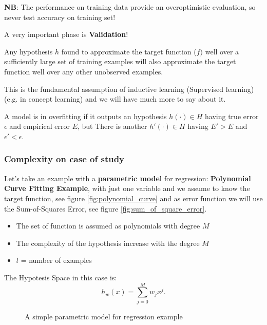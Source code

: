 \documentclass[../main.tex]{subfiles}
\begin{document}
\textbf{NB}: The performance on training data provide an overoptimistic evaluation, so never test accuracy on training set!

\begin{center}
A very important phase is \textbf{Validation}!   
\end{center}

\begin{definition}
Any hypothesis $h$ found to approximate the target function ($f)$ well over a sufficiently large
set of training examples will also approximate the target function well over any other unobserved examples.
\end{definition}

This is the fundamental assumption of inductive learning (Supervised learning) (e.g. in concept learning) and we will have much more to say about it.

\begin{definition}[Overfitting]
A model is in overfitting if it outputs an hypothesis $h(\cdot) \in H$ having true error $\epsilon$ and empirical error $E$, but There is another  $h'(\cdot) \in H$ having $E' > E$ and $\epsilon' < \epsilon$.
\end{definition}

\subsubsection{Complexity on case of study}
Let's take an example with a \textbf{parametric model} for regression: \textbf{Polynomial Curve Fitting Example}, with just one variable and we assume to know the target function, see figure \ref{fig:polynomial_curve} and as error function we will use the Sum-of-Squares Error, see figure \ref{fig:sum_of_square_error}.

\begin{itemize}
    \item The set of function is assumed as polynomials with degree $M$
    \item The complexity of the hypothesis increase with the degree $M$
    \item $l$ = number of examples
\end{itemize}

The Hypotesis Space in this case is:
\[
    h_w(x) = \sum_{j=0}^{M} w_j x^j
.\] 

\begin{figure}[ht]
  \centering
  \hfill
  \caption{A simple parametric model for regression example}
\end{figure}
\end{document}
